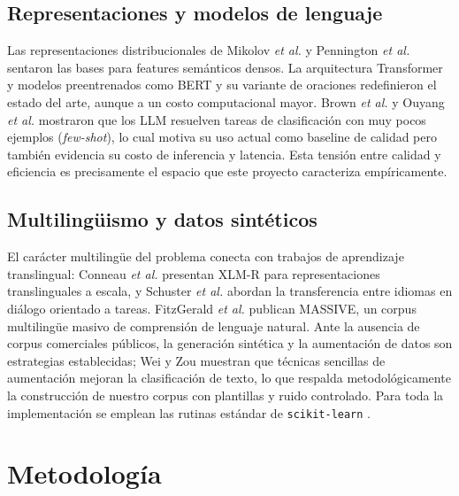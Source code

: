 \documentclass[journal]{IEEEtran}
\newcommand{\code}[1]{\texttt{\small #1}}
\begin{document}
\subsection{Representaciones y modelos de lenguaje}
Las representaciones distribucionales de Mikolov \emph{et al.}
\cite{mikolov2013word2vec} y Pennington \emph{et al.} \cite{pennington2014glove}
sentaron las bases para features sem\'anticos densos. La arquitectura Transformer
\cite{vaswani2017attention} y modelos preentrenados como BERT
\cite{devlin2019bert} y su variante de oraciones \cite{reimers2019sbert}
redefinieron el estado del arte, aunque a un costo computacional mayor. Brown
\emph{et al.} \cite{brown2020gpt3} y Ouyang \emph{et al.}
\cite{ouyang2022instructgpt} mostraron que los LLM resuelven tareas de
clasificaci\'on con muy pocos ejemplos (\emph{few-shot}), lo cual motiva su uso
actual como baseline de calidad pero tambi\'en evidencia su costo de inferencia y
latencia. Esta tensi\'on entre calidad y eficiencia es precisamente el espacio
que este proyecto caracteriza emp\'iricamente.

\subsection{Multiling\"uismo y datos sint\'eticos}
El car\'acter multiling\"ue del problema conecta con trabajos de aprendizaje
translingual: Conneau \emph{et al.} \cite{conneau2020xlmr} presentan XLM-R para
representaciones translinguales a escala, y Schuster \emph{et al.}
\cite{schuster2019crosslingual} abordan la transferencia entre idiomas en
di\'alogo orientado a tareas. FitzGerald \emph{et al.} \cite{fitzgerald2023massive}
publican MASSIVE, un corpus multiling\"ue masivo de comprensi\'on de lenguaje
natural. Ante la ausencia de corpus comerciales p\'ublicos, la generaci\'on
sint\'etica y la aumentaci\'on de datos son estrategias establecidas; Wei y Zou
\cite{wei2019eda} muestran que t\'ecnicas sencillas de aumentaci\'on mejoran la
clasificaci\'on de texto, lo que respalda metodol\'ogicamente la construcci\'on
de nuestro corpus con plantillas y ruido controlado. Para toda la implementaci\'on
se emplean las rutinas est\'andar de \code{scikit-learn} \cite{pedregosa2011scikit}.

\section{Metodolog\'ia}\label{sec:metodologia}
\end{document}
